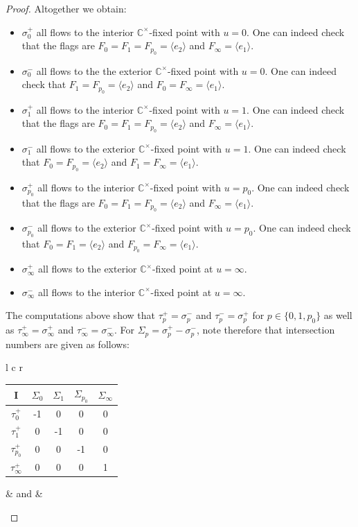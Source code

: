 \documentclass[12pt,letterpaper,reqno]{amsart}
\theoremstyle{remark}
\theoremstyle{definition}
\numberwithin{thm}{section}
\numberwithin{equation}{section}
\numberwithin{figure}{section}
\newcommand{\C}{\ensuremath{\mathbb C}}
\begin{document}
\begin{proof}
Altogether we obtain:

 \begin{itemize}
  \item  $\sigma_0^+$ all flows to the interior $\C^\times$-fixed point with $u=0$. One can indeed check that the flags are $F_0=F_1=F_{p_0}=\langle e_2\rangle$ and $F_\infty=\langle e_1\rangle$.
   \item $\sigma_0^-$ all flows to the the exterior $\C^\times$-fixed point with $u=0$. One can indeed check that $F_1=F_{p_0}=\langle e_2\rangle$ and $F_0=F_\infty=\langle e_1\rangle$.
   \item $\sigma_1^+$ all flows to the interior $\C^\times$-fixed point with $u=1$. One can indeed check that the flags are $F_0=F_1=F_{p_0}=\langle e_2\rangle$ and $F_\infty=\langle e_1\rangle$.
    \item$\sigma_1^-$ all flows to the exterior $\C^\times$-fixed point with $u=1$. One can indeed check that $F_0=F_{p_0}=\langle e_2\rangle$ and $F_1=F_\infty=\langle e_1\rangle$.  
       \item $\sigma_{p_0}^+$ all flows to the interior $\C^\times$-fixed point with $u=p_0$. One can indeed check that the flags are $F_0=F_1=F_{p_0}=\langle e_2\rangle$ and $F_\infty=\langle e_1\rangle$. 
        \item $\sigma_{p_0}^-$ all flows to the exterior $\C^\times$-fixed point with $u=p_0$. One can indeed check that $F_0=F_1=\langle e_2\rangle$ and $F_{p_0}=F_\infty=\langle e_1\rangle$. 
        \item $\sigma_{\infty}^+$ all flows to the exterior $\C^\times$-fixed point at $u=\infty$.
        \item $\sigma_{\infty}^-$ all flows to the interior $\C^\times$-fixed point at $u=\infty$. 
        \end{itemize}
\smallskip
The computations above show that $\tau_p^+ = \sigma_p^-$ and $\tau_p^- = \sigma_p^+$ for $p \in \{ 0,1,p_0\}$ as well as $\tau_\infty^+ = \sigma_\infty^+$ and $\tau_\infty^-= \sigma_\infty^-$.  
For $\Sigma_p = \sigma_p^+ - \sigma_p^-$, note
therefore that  intersection numbers are given as follows:
\begin{center}
\begin{tabular}{l c r}
	
\begin{tabular}{  c | c | c |c|c }
    I & $\Sigma_0$ & $\Sigma_1$ & $\Sigma_{p_0}$ & $\Sigma_\infty$ \\ \hline
    $\tau_0^+$ & -1 & 0 & 0 & 0\\ \hline
    $\tau_1^+$ & 0 & -1 & 0 & 0\\ \hline
    $\tau_{p_0}^+$ & 0 & 0  & -1 & 0\\ \hline
    $\tau_\infty^+$ & 0 & 0  & 0 & 1\\
\end{tabular}
&  \quad and \quad &


\end{tabular}
\end{center}
\end{proof}
\end{document}
